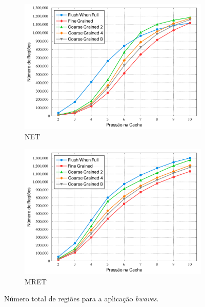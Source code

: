 \documentclass[12pt,twoside]{article}
\begin{document}
\begin{figure}[!ht]
        \centering
        \begin{subfigure}[b]{0.48\textwidth}
                \includegraphics[width=\textwidth]{./figs/net-bwaves-tot-regions}
                \caption{NET}
				\label{fig-total-regs-net}
        \end{subfigure}
        \quad
                \begin{subfigure}[b]{0.48\textwidth}
                \includegraphics[width=\textwidth]{./figs/mret-bwaves-tot-regions}
                \caption{MRET}
        \end{subfigure}
\caption{Número total de regiões para a aplicação \emph{bwaves}.}
\label{fig-total-regs}
\end{figure}
\end{document}
